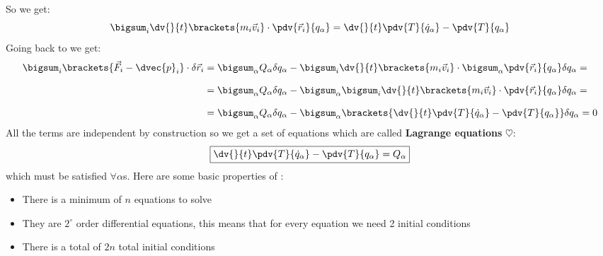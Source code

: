 So we get:
\begin{equation}
    \bigsum_i \dv{}{t}\brackets{m_i\vec{v}_i}\cdot \pdv{ \vec{r}_i}{ q_{\alpha}} = \dv{}{t}\pdv{ T}{ \dot{q}_{\alpha}} - \pdv{ T}{ q_{\alpha}}
\end{equation}
Going back to \dalembertref\;we get:
\begin{equation}
    \begin{split}
      \bigsum_i \brackets{\vec{F}_i - \dvec{p}_i} \cdot \delta \vec{r}_i &= \bigsum_{\alpha}Q_{\alpha}\delta q_{\alpha} - \bigsum_i \dv{}{t}\brackets{m_i\vec{v}_i} \cdot \bigsum_{\alpha}\pdv{ \vec{r}_i}{ q_{\alpha}}\delta q_{\alpha} = \\[8pt]
      &= \bigsum_{\alpha}Q_{\alpha}\delta q_{\alpha} - \bigsum_{\alpha}\bigsum_i \dv{}{t}\brackets{m_i\vec{v}_i} \cdot \pdv{ \vec{r}_i}{ q_{\alpha}}\delta q_{\alpha} = \\[8pt]
      &= \bigsum_{\alpha}Q_{\alpha}\delta q_{\alpha} - \bigsum_{\alpha}\brackets{\dv{}{t}\pdv{ T}{ \dot{q}_{\alpha}} - \pdv{ T}{ q_{\alpha}}}\delta q_{\alpha} = 0
    \end{split}
\end{equation}
All the terms are independent by construction so we get a set of equations which are called \textbf{Lagrange equations} $\heartsuit$:
\begin{equation} \label{Lagrange_equations}
    \boxed{\dv{}{t}\pdv{ T}{ \dot{q}_{\alpha}} - \pdv{ T}{ q_{\alpha}} = Q_{\alpha}}
\end{equation}
which must be satisfied $\forall \alpha$s.
Here are some basic properties of \lagrangeref :
\begin{itemize}
    \item There is a minimum of $n$ equations to solve
    \item They are $2^\circ$ order differential equations, this means that for every equation we need 2 initial conditions
    \item There is a total of $2n$ total initial conditions
\end{itemize}
